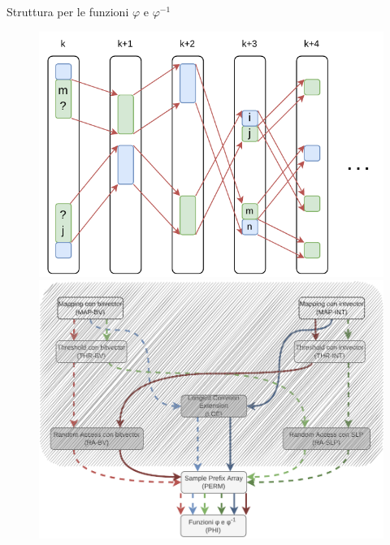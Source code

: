 \documentclass[]{beamer}
\def\rank{\mbox{\rm {\sf rank}}}
\begin{document}
\begin{frame}{Struttura per le funzioni $\varphi$ e $\varphi^{-1}$}
  \begin{figure}[H]
    \centering
    \includegraphics[scale = 0.65, valign=t]{img/phi.pdf}
    \includegraphics[scale = 0.28, valign=t]{img/mini_phi2.pdf}
  \end{figure}
  
\end{frame}
\end{document}
